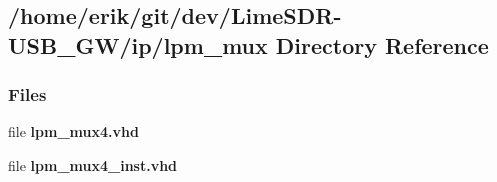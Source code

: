 \subsection{/home/erik/git/dev/\+Lime\+S\+D\+R-\/\+U\+S\+B\+\_\+\+G\+W/ip/lpm\+\_\+mux Directory Reference}
\label{dir_8a4633cb7f7d9d2412c6caeb51f976cd}
\subsubsection*{Files}
\begin{DoxyCompactItemize}
\item 
file {\bf lpm\+\_\+mux4.\+vhd}
\item 
file {\bf lpm\+\_\+mux4\+\_\+inst.\+vhd}
\end{DoxyCompactItemize}
